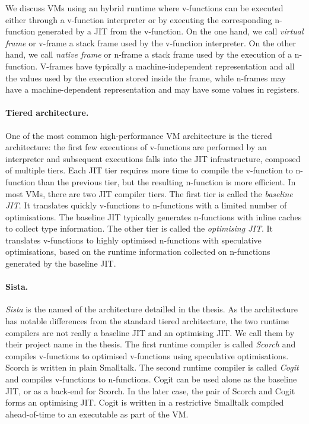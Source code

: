 \documentclass[a4paper,12pt,twoside]{../includes/ThesisStyle}
\begin{document}
We discuss VMs using an hybrid runtime where v-functions can be executed either through a v-function interpreter or by executing the corresponding n-function generated by a JIT from the v-function. On the one hand, we call \emph{virtual frame} or v-frame a stack frame used by the v-function interpreter. On the other hand, we call \emph{native frame} or n-frame a stack frame used by the execution of a n-function. V-frames have typically a machine-independent representation and all the values used by the execution stored inside the frame, while n-frames may have a machine-dependent representation and may have some values in registers.

\paragraph{Tiered architecture.} One of the most common high-performance VM architecture is the tiered architecture: the first few executions of v-functions are performed by an interpreter and subsequent executions falls into the JIT infrastructure, composed of multiple tiers. Each JIT tier requires more time to compile the v-function to n-function than the previous tier, but the resulting n-function is more efficient. In most VMs, there are two JIT compiler tiers. The first tier is called the \emph{baseline JIT}. It translates quickly v-functions to n-functions with a limited number of optimisations. The baseline JIT typically generates n-functions with inline caches to collect type information. The other tier is called the \emph{optimising JIT}. It translates v-functions to highly optimised n-functions with speculative optimisations, based on the runtime information collected on n-functions generated by the baseline JIT.

\paragraph{Sista.} \emph{Sista} is the named of the architecture detailled in the thesis. As the architecture has notable differences from the standard tiered architecture, the two runtime compilers are not really a baseline JIT and an optimising JIT. We call them by their project name in the thesis. The first runtime compiler is called \emph{Scorch} and compiles v-functions to optimised v-functions using speculative optimisations. Scorch is written in plain Smalltalk. The second runtime compiler is called \emph{Cogit} and compiles v-functions to n-functions. Cogit can be used alone as the baseline JIT, or as a back-end for Scorch. In the later case, the pair of Scorch and Cogit forms an optimising JIT. Cogit is written in a restrictive Smalltalk compiled ahead-of-time to an executable as part of the VM. 
\end{document}
